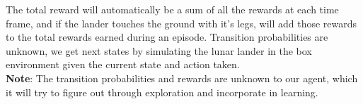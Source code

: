 The total reward will automatically be a sum of all the rewards at each time frame, and if the lander touches the ground with it's legs, will add those rewards to the total rewards earned during an episode. Transition probabilities are unknown, we get next states by simulating the lunar lander in the box environment given the current state and action taken. \\

\textbf{Note}: The transition probabilities and rewards are unknown to our agent, which it will try to figure out through exploration and incorporate in learning. 

